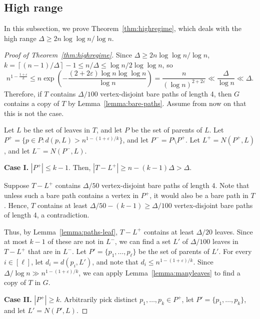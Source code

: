 \documentclass{article}
\theoremstyle{plain}
\theoremstyle{definition}
\numberwithin{equation}{section}
\def\eps{\varepsilon}
\newcommand\ceil[1]{\left\lceil#1\right\rceil}
\begin{document}
\subsection{High range}\label{sec:main1}%
In this subsection, we prove Theorem~\ref{thm:highregime}, which deals with the high range $\Delta\geq2n\log\log n/\log n$.
\begin{proof}[Proof of Theorem~\ref{thm:highregime}]
Since $\Delta\geq2n\log\log n/\log n$, $k=\ceil{(n-1)/\Delta}-1\leq n/\Delta\leq\log n/2\log\log n$, so 
\[n^{1-\frac{1+\eps}{k}}\leq n\exp\left(-\frac{(2+2\eps)\log n\log\log n}{\log n}\right)=\frac{n}{(\log n)^{2+2\eps}}\ll\frac\Delta{\log n}\ll\Delta.\]
Therefore, if $T$ contains $\Delta/100$ vertex-disjoint bare paths of length 4, then $G$ contains a copy of $T$ by Lemma~\ref{lemma:bare-paths}. Assume from now on that this is not the case.  

Let $L$ be the set of leaves in $T$, and let $P$ be the set of parents of $L$. Let $P^+=\{p\in P:d(p,L)>n^{1-(1+\eps)/k}\}$, and let $P^-=P\setminus P^+$. Let $L^+=N(P^+,L)$, and let $L^-=N(P^-,L)$. 

\medskip

\noindent\textbf{Case I.} $|P^+|\leq k-1$. Then, $|T-L^+|\geq n-(k-1)\Delta>\Delta$.

Suppose $T-L^+$ contains $\Delta/50$ vertex-disjoint bare paths of length 4. Note that unless such a bare path contains a vertex in $P^+$, it would also be a bare path in $T$. Hence, $T$ contains at least $\Delta/50-(k-1)\geq\Delta/100$ vertex-disjoint bare paths of length 4, a contradiction. 

Thus, by Lemma~\ref{lemma:paths-leaf}, $T-L^+$ contains at least $\Delta/20$ leaves. Since at most $k-1$ of these are not in $L^-$, we can find a set $L'$ of $\Delta/100$ leaves in $T-L^+$ that are in $L^-$. Let $P'=\{p_1,\ldots,p_\ell\}$ be the set of parents of $L'$. For every $i\in[\ell]$, let $d_i=d(p_i,L')$, and note that $d_i\leq n^{1-(1+\eps)/k}$. Since $\Delta/\log n\gg n^{1-(1+\eps)/k}$, we can apply Lemma~\ref{lemma:manyleaves} to find a copy of $T$ in $G$.

\medskip

\noindent\textbf{Case II.} $|P^+|\geq k$. Arbitrarily pick distinct $p_1,\ldots,p_k\in P^+$, let $P'=\{p_1,\ldots,p_k\}$, and let $L'=N(P',L)$. 


\end{proof}
\end{document}
